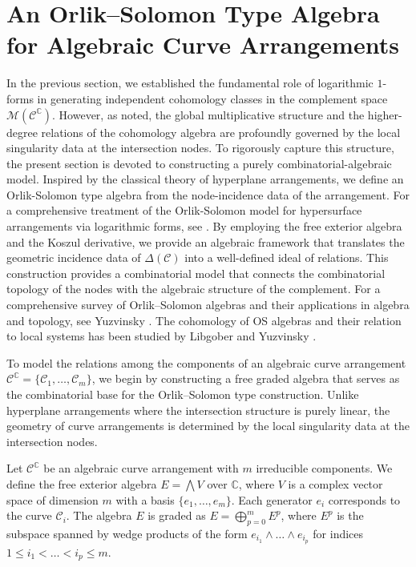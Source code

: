\documentclass[article,11pt]{amsart} \numberwithin{equation}{section}
\numberwithin{equation}{section}
\begin{document}
{\section{An Orlik–Solomon Type Algebra for Algebraic Curve Arrangements}
\label{sec6}

In the previous section, we established the fundamental role of logarithmic $1$-forms in generating independent cohomology classes in the complement space $\mathcal{M}(\mathcal{C}^\mathbb{C})$. However, as noted, the global multiplicative structure and the higher-degree relations of the cohomology algebra are profoundly governed by the local singularity data at the intersection nodes. To rigorously capture this structure, the present section is devoted to constructing a purely combinatorial-algebraic model. Inspired by the classical theory of hyperplane arrangements, we define an Orlik-Solomon type algebra from the node-incidence data of the arrangement. For a comprehensive treatment of the Orlik-Solomon model for hypersurface arrangements via logarithmic forms, see \cite{Dupont2015}. By employing the free exterior algebra and the Koszul derivative, we provide an algebraic framework that translates the geometric incidence data of $\Delta(\mathcal{C})$ into a well-defined ideal of relations. This construction provides a combinatorial model that connects the combinatorial topology of the nodes with the algebraic structure of the complement. For a comprehensive survey of Orlik–Solomon algebras and their applications in algebra and topology, see Yuzvinsky \cite{Yuzvinsky}. The cohomology of OS algebras and their relation to local systems has been studied by Libgober and Yuzvinsky \cite{LibgoberYuzvinsky2000}.

To model the relations among the components of an algebraic curve arrangement $\mathcal{C}^\mathbb{C} = \{\mathscr{C}_1, \dots, \mathscr{C}_m\}$, we begin by constructing a free graded algebra that serves as the combinatorial base for the Orlik--Solomon type construction. Unlike hyperplane arrangements where the intersection structure is purely linear, the geometry of curve arrangements is determined by the local singularity data at the intersection nodes. 

\begin{df}\label{def:exterior_algebra} 
	Let $\mathcal{C}^\mathbb{C}$ be an algebraic curve arrangement with $m$ irreducible components. We define the free exterior algebra $E = \bigwedge V$ over $\mathbb{C}$, where $V$ is a complex vector space of dimension $m$ with a basis $\{e_1, \dots, e_m\}$. Each generator $e_i$ corresponds to the curve $\mathscr{C}_i$. The algebra $E$ is graded as $E = \bigoplus_{p=0}^m E^p$, where $E^p$ is the subspace spanned by wedge products of the form $e_{i_1} \wedge \dots \wedge e_{i_p}$ for indices $1 \le i_1 < \dots < i_p \le m$.
\end{df}

}
\end{document}
